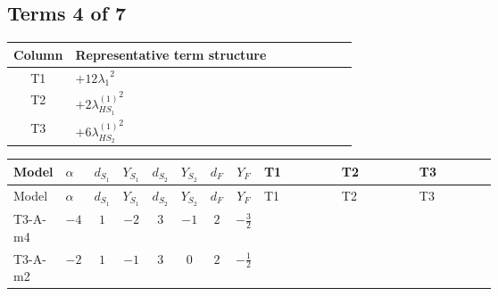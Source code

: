 \documentclass[8pt]{article}
\begin{document}
\begin{landscape}
\subsection*{Terms 4 of 7}
\begin{center}
\begin{tabular}{@{}c >{\raggedright\arraybackslash}p{0.82\linewidth}@{}}
\toprule
Column & Representative term structure \\
\midrule
T1 & \(\displaystyle +12 {\lambda_1}^2\) \\
\midrule
T2 & \(\displaystyle +2 {\lambda_{HS_1}^{(1)}}^2\) \\
\midrule
T3 & \(\displaystyle +6 {\lambda_{HS_2}^{(1)}}^2\) \\
\midrule
\bottomrule
\end{tabular}
\end{center}
\smallskip
\tiny
\begin{longtable}{@{}llcccccc >{\raggedright\arraybackslash}p{0.21\linewidth} >{\raggedright\arraybackslash}p{0.21\linewidth} >{\raggedright\arraybackslash}p{0.21\linewidth}@{}}
\toprule
Model & $\alpha$ & $d_{S_1}$ & $Y_{S_1}$ & $d_{S_2}$ & $Y_{S_2}$ & $d_F$ & $Y_F$ & T1 & T2 & T3 \\
\midrule
\endfirsthead
\toprule
Model & $\alpha$ & $d_{S_1}$ & $Y_{S_1}$ & $d_{S_2}$ & $Y_{S_2}$ & $d_F$ & $Y_F$ & T1 & T2 & T3 \\
\midrule
\endhead
T3-A-m4 & $-4$ & $1$ & $-2$ & $3$ & $-1$ & $2$ & $-\frac{3}{2}$ & \scriptsize\adjustbox{max width=\linewidth}{$\begin{gathered} +12 {\lambda_1}^2\end{gathered}$} & \scriptsize\adjustbox{max width=\linewidth}{$\begin{gathered} +2 {\lambda_{HS_1}^{(1)}}^2\end{gathered}$} & \scriptsize\adjustbox{max width=\linewidth}{$\begin{gathered} +6 {\lambda_{HS_2}^{(1)}}^2\end{gathered}$} \\
\midrule
T3-A-m2 & $-2$ & $1$ & $-1$ & $3$ & $0$ & $2$ & $-\frac{1}{2}$ & \scriptsize\adjustbox{max width=\linewidth}{$\begin{gathered} +12 {\lambda_1}^2\end{gathered}$} & \scriptsize\adjustbox{max width=\linewidth}{$\begin{gathered} +2 {\lambda_{HS_1}^{(1)}}^2\end{gathered}$} & \scriptsize\adjustbox{max width=\linewidth}{$\begin{gathered} +6 {\lambda_{HS_2}^{(1)}}^2\end{gathered}$} \\

\end{longtable}
\end{landscape}
\end{document}
